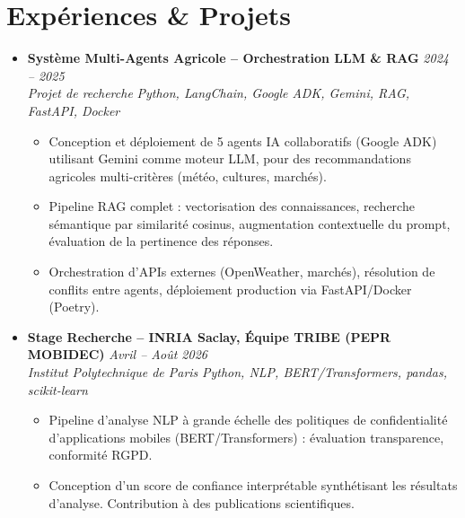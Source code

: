 \documentclass[a4paper,11pt]{article}
\begin{document}
\section{Expériences \& Projets}
\begin{itemize}[leftmargin=*, label={-}]

\item \textbf{Système Multi-Agents Agricole -- Orchestration LLM \& RAG} \hfill \textit{2024 -- 2025} \\
\textit{Projet de recherche} \hfill \textit{Python, LangChain, Google ADK, Gemini, RAG, FastAPI, Docker}
\vspace{-2pt}
    \begin{itemize}[leftmargin=0.4cm, nosep, label=\tiny$\bullet$]
        \item \small{Conception et déploiement de 5 agents IA collaboratifs (Google ADK) utilisant Gemini comme moteur LLM, pour des recommandations agricoles multi-critères (météo, cultures, marchés).}
        \item \small{Pipeline RAG complet : vectorisation des connaissances, recherche sémantique par similarité cosinus, augmentation contextuelle du prompt, évaluation de la pertinence des réponses.}
        \item \small{Orchestration d'APIs externes (OpenWeather, marchés), résolution de conflits entre agents, déploiement production via FastAPI/Docker (Poetry).}
    \end{itemize}
\vspace{3pt}

\item \textbf{Stage Recherche -- INRIA Saclay, Équipe TRIBE (PEPR MOBIDEC)} \hfill \textit{Avril -- Août 2026} \\
\textit{Institut Polytechnique de Paris} \hfill \textit{Python, NLP, BERT/Transformers, pandas, scikit-learn}
\vspace{-2pt}
    \begin{itemize}[leftmargin=0.4cm, nosep, label=\tiny$\bullet$]
        \item \small{Pipeline d'analyse NLP à grande échelle des politiques de confidentialité d'applications mobiles (BERT/Transformers) : évaluation transparence, conformité RGPD.}
        \item \small{Conception d'un score de confiance interprétable synthétisant les résultats d'analyse. Contribution à des publications scientifiques.}
    \end{itemize}
\vspace{3pt}


\end{itemize}
\end{document}
